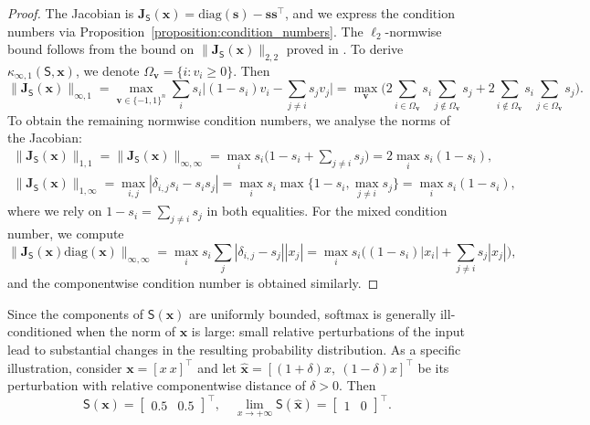 \documentclass[namedate,webpdf,imanum]{ima-authoring-template}
\newcommand{\Matrix}[1]{\mathbf{#1}}
\newcommand{\trans}{\intercal}
\newcommand{\diag}[2][]{\mathrm{diag}#1( #2 #1)}
\newcommand{\Norm}[3][]{#1\| #2 #1\|_{\mathrm{#3}}}
\newcommand{\Layer}[1]{\mathsf{#1}}
\newcommand{\cond}[3][]{\kappa_{\mathrm{#2}} #1( #3 #1)}
\numberwithin{equation}{section}
\begin{document}
\begin{proof}
The Jacobian is $\Matrix{J}_{\Layer{S}}(\Matrix{x}) = \diag{\Matrix{s}} - \Matrix{s} \Matrix{s}^\trans$, and we express the condition numbers via Proposition~\ref{proposition:condition_numbers}.
The $\ell_2$-normwise bound follows from the bound on $\Norm{\Matrix{J}_{\Layer{S}}(\Matrix{x})}{2,2}$ proved in \cite{yudin2025pay}.
To derive $\cond{\infty,1}{\Layer{S}, \Matrix{x}}$, we denote $\Omega_{\Matrix{v}} = \{ i : v_i \geq 0 \}$.
Then
\begin{equation*}
    \Norm{\Matrix{J}_{\Layer{S}}(\Matrix{x})}{\infty,1} = \max_{\Matrix{v} \in \{-1,1\}^{n}} \sum_{i} s_i \Big| (1-s_i)v_i - \sum_{j \neq i} s_j v_j \Big| = \max_{\Matrix{v}} \bigg( 2 \sum_{i \in \Omega_{\Matrix{v}}} s_i \sum_{j \not\in \Omega_{\Matrix{v}}} s_j + 2 \sum_{i \not\in \Omega_{\Matrix{v}}} s_i \sum_{j \in \Omega_{\Matrix{v}}} s_j \bigg).
\end{equation*}
To obtain the remaining normwise condition numbers, we analyse the norms of the Jacobian:
\begin{gather*}
    \Norm{\Matrix{J}_{\Layer{S}}(\Matrix{x})}{1,1} = \Norm{\Matrix{J}_{\Layer{S}}(\Matrix{x})}{\infty,\infty} = \max_i s_i \Big( 1 - s_i + \sum_{j \neq i} s_j \Big) = 2 \max_i s_i (1 - s_i), \\
    \Norm{\Matrix{J}_{\Layer{S}}(\Matrix{x})}{1,\infty} = \max_{i,j} |\delta_{i,j} s_i - s_i s_j| = \max_i s_i \max\{ 1 - s_i, \max_{j \neq i} s_j \} = \max_i s_i (1 - s_i),
\end{gather*}
where we rely on $1 - s_i = \sum_{j \neq i} s_j$ in both equalities.
For the mixed condition number, we compute
\begin{equation*}
    \Norm{\Matrix{J}_{\Layer{S}}(\Matrix{x}) \diag{\Matrix{x}}}{\infty,\infty} = \max_i s_i \sum_{j} |\delta_{i,j} - s_j| |x_j| = \max_i s_i \Big( (1 - s_i) |x_i| + \sum_{j \neq i} s_j |x_j| \Big),
\end{equation*}
and the componentwise condition number is obtained similarly.
\end{proof}

Since the components of $\Layer{S}(\Matrix{x})$ are uniformly bounded, softmax is generally ill-conditioned when the norm of $\Matrix{x}$ is large: small relative perturbations of the input lead to substantial changes in the resulting probability distribution.
As a specific illustration, consider $\Matrix{x} = [x~x]^\trans$ and let $\hat{\Matrix{x}} = [(1 + \delta)x,~(1-\delta)x]^\trans$ be its perturbation with relative componentwise distance of $\delta > 0$.
Then
\begin{equation*}
    \Layer{S}(\Matrix{x}) = \begin{bmatrix}
        0.5 & 0.5
    \end{bmatrix}^\trans, \quad \lim_{x \to +\infty} \Layer{S}(\hat{\Matrix{x}}) = \begin{bmatrix}
        1 & 0
    \end{bmatrix}^\trans.
\end{equation*}
\end{document}
